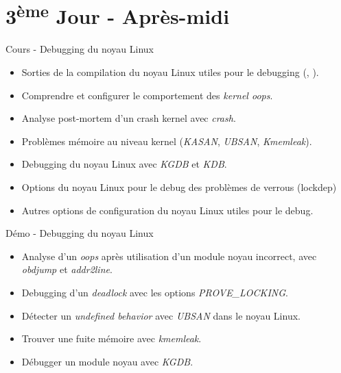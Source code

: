 \documentclass[a4paper,12pt,obeyspaces,spaces,hyphens]{article}
\begin{document}
\section{3\textsuperscript{ème} Jour - Après-midi}

\feagendatwocolumn
{Cours - Debugging du noyau Linux}
{
  \begin{itemize}
  \item Sorties de la compilation du noyau Linux utiles pour le
    debugging (, ).
  \item Comprendre et configurer le comportement des {\em kernel oops}.
  \item Analyse post-mortem d'un crash kernel avec {\em crash}.
  \item Problèmes mémoire au niveau kernel ({\em KASAN}, {\em UBSAN}, {\em Kmemleak}).
  \item Debugging du noyau Linux avec {\em KGDB} et {\em KDB}.
  \item Options du noyau Linux pour le debug des problèmes de verrous
    (lockdep)
  \item Autres options de configuration du noyau Linux utiles pour le
    debug.
  \end{itemize}
}
{Démo - Debugging du noyau Linux}
{
  \begin{itemize}
  \item Analyse d'un {\em oops} après utilisation d'un module noyau
    incorrect, avec {\em obdjump} et {\em addr2line}.
  \item Debugging d'un {\em deadlock} avec les options {\em PROVE\_LOCKING}.
  \item Détecter un {\em undefined behavior} avec {\em UBSAN} dans le noyau Linux.
  \item Trouver une fuite mémoire avec {\em kmemleak}.
  \item Débugger un module noyau avec {\em KGDB}.
  \end{itemize}
}
\end{document}
